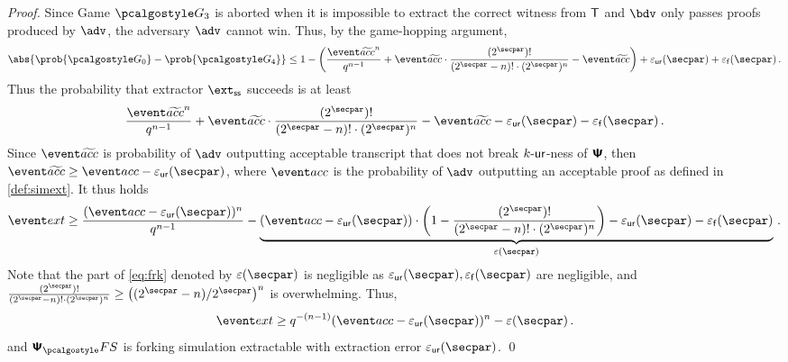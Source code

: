 \begin{proof}
		Since Game $\game{3}$ is aborted when it is impossible to extract the correct witness from
		$\mathsf{T}$ and $\bdv$ only passes proofs produced by $\adv$, the adversary $\advse$ cannot
		win. Thus, by the game-hopping argument,
		\[
		\abs{\prob{\game{0}} - \prob{\game{4}}} \leq 1 -
		\left(\frac{\waccProb^{n}}{q^{n - 1}} + \waccProb \cdot \frac{(2^\secpar)
			!}{(2^\secpar - n)! \cdot (2^\secpar)^{n}} - \waccProb\right) + \epsur(\secpar) +
		\epsss(\secpar)\,.
		\]
		Thus the probability that extractor $\extss$ succeeds is at least
		\[
		\frac{\waccProb^{n}}{q^{n - 1}} + \waccProb \cdot \frac{(2^\secpar)
			!}{(2^\secpar - n)! \cdot (2^\secpar)^{n}} - \waccProb - \epsur(\secpar) 
		- \epsss(\secpar)\,.
		\]
		Since $\waccProb$ is probability of $\advse$ outputting acceptable transcript
		that does not break ${k\text{-}\mathsf{ur}}$-ness of $\bm{\mathsf{\Psi}}$, then $\waccProb \geq \accProb -
		\epsur(\secpar)$, where $\accProb$ is the probability of $\advse$ outputting an acceptable
		proof as defined in \cref{def:simext}. It thus holds
		\begin{equation}
		\label{eq:frk}
		\extProb \geq \frac{(\accProb - \epsur(\secpar))^{n}}{q^{n - 1}} -
		\underbrace{(\accProb - \epsur(\secpar)) \cdot \left( 1 - \frac{(2^\secpar)
				!}{(2^\secpar - n)! \cdot (2^\secpar)^{n}}\right) - \epsur(\secpar) -
			\epsss(\secpar)}_{\eps(\secpar)}\,.
		\end{equation}
		Note that the part of \cref{eq:frk} denoted by $\eps(\secpar)$ is negligible as
		$\epsur(\secpar), \epsss(\secpar)$ are negligible, and
		$\frac{(2^\secpar) !}{(2^\secpar - n)! \cdot (2^\secpar)^{n}} \geq
		\left(\infrac{(2^\secpar - n)}{2^\secpar}\right)^{n}$ is overwhelming.  Thus,
		\[
		\extProb \geq q^{-(n - 1)} (\accProb - \epsur(\secpar))^{n} -\eps(\secpar)\,.
		\] 
		and $\psfs$ is forking simulation extractable with extraction error $\epsur(\secpar)$.
	\qed
\end{proof}
